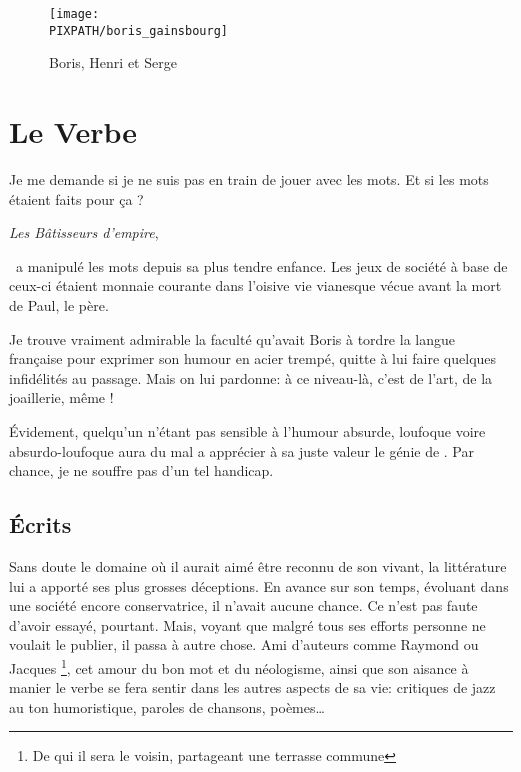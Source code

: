 \begin{figure}
\centering
\texttt{[image: \\PIXPATH/boris\_gainsbourg]}
\caption{Boris, Henri et Serge}
\end{figure}


\section{Le Verbe}
\epigraph{Je me demande si je ne suis pas en train de jouer avec les mots. Et si les mots étaient faits pour ça ?}
{\emph{Les Bâtisseurs d'empire}, \BV}

\BV\ a manipulé les mots depuis sa plus tendre enfance. Les jeux de société à base
de ceux-ci étaient monnaie courante dans l'oisive vie vianesque vécue avant la mort
de Paul, le père.


Je trouve vraiment admirable la faculté qu'avait Boris à tordre la langue
française pour exprimer son humour en acier trempé, quitte à lui faire
quelques infidélités au passage. Mais on lui pardonne: à ce niveau-là, c'est
de l'art, de la joaillerie, même !

Évidement, quelqu'un n'étant pas sensible à l'humour absurde, loufoque voire
absurdo-loufoque aura du mal a apprécier à sa juste valeur le génie de \BV.
Par chance, je ne souffre pas d'un tel handicap.

\subsection{Écrits}

Sans doute le domaine où il aurait aimé être reconnu de son vivant, la littérature lui a apporté
ses plus grosses déceptions. En avance sur son temps, évoluant dans une société encore conservatrice,
il n'avait aucune chance. Ce n'est pas faute d'avoir essayé, pourtant. Mais, voyant que malgré tous
ses efforts personne ne voulait le publier, il passa à autre chose.
Ami d'auteurs comme Raymond  ou Jacques \footnote{De qui il sera le voisin, partageant une
terrasse commune}, cet amour du bon mot et du néologisme, ainsi que son aisance à manier
le verbe se fera sentir dans les autres aspects de sa vie: critiques de jazz au ton humoristique, paroles de chansons,
poèmes\ldots

